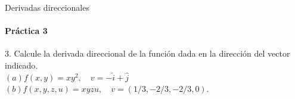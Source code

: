 \documentclass{plantillaPPT}
\begin{document}
\begin{frame}{Derivadas direccionales}
\framesubtitle{Práctica 3}

3. Calcule la derivada direccional de la función dada en la dirección del vector indicado. \\[10pt]

\((a) f(x,y)=xy^2, \quad v=-\hat{i}+\hat{j}\)\\[5pt]
\((b) f(x,y,z,u) = xyzu, \quad v = (1/3, -2/3, -2/3, 0)\).
    
\end{frame}
\end{document}
